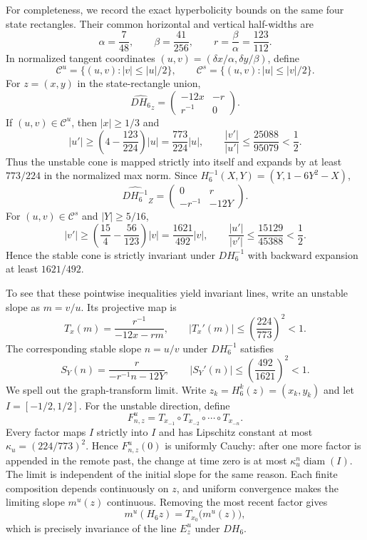 For completeness, we record the exact hyperbolicity bounds on the same four
state rectangles.  Their common horizontal and vertical half-widths are
\[
 \alpha=\frac7{48},\qquad \beta=\frac{41}{256},\qquad
 r=\frac\beta\alpha=\frac{123}{112}.
\]
In normalized tangent coordinates
$(u,v)=(\delta x/\alpha,\delta y/\beta)$, define
\[
 \mathcal C^u=\{(u,v):|v|\leq |u|/2\},\qquad
 \mathcal C^s=\{(u,v):|u|\leq |v|/2\}.
\]
For $z=(x,y)$ in the state-rectangle union,
\[
 \widehat{DH_6}_z=
 \begin{pmatrix}-12x&-r\\r^{-1}&0\end{pmatrix}.
\]
If $(u,v)\in\mathcal C^u$, then $|x|\geq1/3$ and
\[
 |u'|\geq\left(4-\frac{123}{224}\right)|u|
 =\frac{773}{224}|u|,
 \qquad
 \frac{|v'|}{|u'|}
 \leq\frac{25088}{95079}<\frac12.
\]
Thus the unstable cone is mapped strictly into itself and expands by at least
$773/224$ in the normalized max norm.  Since
$H_6^{-1}(X,Y)=(Y,1-6Y^2-X)$,
\[
 \widehat{DH_6^{-1}}_Z=
 \begin{pmatrix}0&r\\-r^{-1}&-12Y\end{pmatrix}.
\]
For $(u,v)\in\mathcal C^s$ and $|Y|\geq5/16$,
\[
 |v'|\geq\left(\frac{15}{4}-\frac{56}{123}\right)|v|
 =\frac{1621}{492}|v|,
 \qquad
 \frac{|u'|}{|v'|}
 \leq\frac{15129}{45388}<\frac12.
\]
Hence the stable cone is strictly invariant under $DH_6^{-1}$ with backward
expansion at least $1621/492$.

To see that these pointwise inequalities yield invariant lines, write an
unstable slope as $m=v/u$.  Its projective map is
\[
 T_x(m)=\frac{r^{-1}}{-12x-rm},
 \qquad
 |T_x'(m)|\leq\left(\frac{224}{773}\right)^2<1.
\]
The corresponding stable slope $n=u/v$ under $DH_6^{-1}$ satisfies
\[
 S_Y(n)=\frac{r}{-r^{-1}n-12Y},
 \qquad
 |S_Y'(n)|\leq\left(\frac{492}{1621}\right)^2<1.
\]
We spell out the graph-transform limit.  Write
$z_k=H_6^k(z)=(x_k,y_k)$ and let $I=[-1/2,1/2]$.  For the unstable direction,
define
\[
 F^u_{n,z}=T_{x_{-1}}\circ T_{x_{-2}}\circ\cdots\circ T_{x_{-n}}.
\]
Every factor maps $I$ strictly into $I$ and has Lipschitz constant at most
$\kappa_u=(224/773)^2$.  Hence $F^u_{n,z}(0)$ is uniformly Cauchy: after one
more factor is appended in the remote past, the change at time zero is at most
$\kappa_u^n\operatorname{diam}(I)$.  The limit is independent of the initial
slope for the same reason.  Each finite composition depends continuously on
$z$, and uniform convergence makes the limiting slope $m^u(z)$ continuous.
Removing the most recent factor gives
\[
 m^u(H_6z)=T_{x_0}\bigl(m^u(z)\bigr),
\]
which is precisely invariance of the line $E^u_z$ under $DH_6$.

